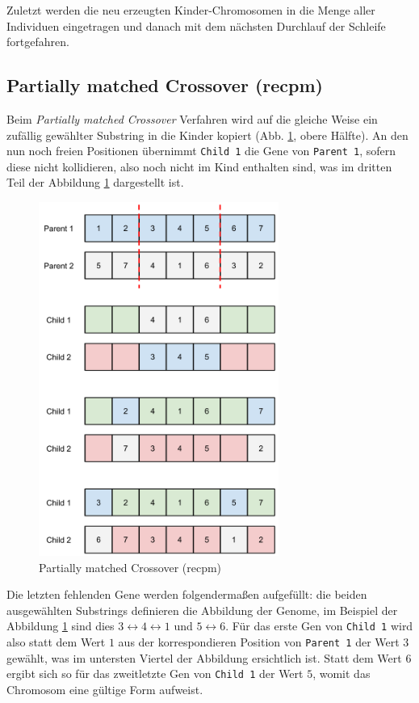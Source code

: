 
\noindent Zuletzt werden die neu erzeugten Kinder-Chromosomen in die Menge aller
Individuen eingetragen und danach mit dem nächsten Durchlauf der Schleife
fortgefahren.



\subsection{Partially matched Crossover (recpm)}

Beim \emph{Partially matched Crossover} Verfahren wird auf die gleiche Weise ein
zufällig gewählter Substring in die Kinder kopiert (Abb. \ref{fig.recpm}, obere Hälfte).
An den nun noch freien Positionen übernimmt {\tt Child 1} die Gene von
{\tt Parent 1}, sofern diese nicht kollidieren, also noch nicht im Kind
enthalten sind, was im dritten Teil der Abbildung \ref{fig.recpm} dargestellt
ist.

\begin{figure}[h!]
  \centering
  \includegraphics[width=0.7\textwidth]{Figures/recpm.pdf}
  \caption{Partially matched Crossover (recpm)}\label{fig.recpm}
\end{figure}

Die letzten fehlenden Gene werden folgendermaßen aufgefüllt: die beiden
ausgewählten Substrings definieren die Abbildung der Genome, im Beispiel der
Abbildung \ref{fig.recpm} sind dies $3 \leftrightarrow 4 \leftrightarrow 1$ und
$5 \leftrightarrow 6$.
Für das erste Gen von {\tt Child 1} wird also statt dem Wert $1$ aus der
korrespondieren Position von  {\tt Parent 1} der Wert $3$ gewählt, was im
untersten Viertel der Abbildung ersichtlich ist.
Statt dem Wert $6$ ergibt sich so für das zweitletzte Gen von {\tt Child 1}
der Wert $5$, womit das Chromosom eine gültige Form aufweist. \citep{erben}


